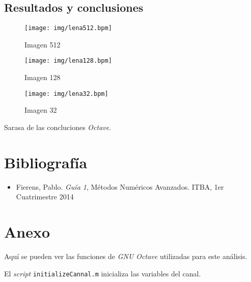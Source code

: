 \documentclass{article}
\begin{document}
\begin{multicols}{2}
\section{Resultados y conclusiones}
\label{sec4}

\begin{figure}[H]
\centering
\texttt{[image: img/lena512.bpm]}
\caption{Imagen 512}
\label{Imagen 512}
\end{figure}

\begin{figure}[H]
\centering
\texttt{[image: img/lena128.bpm]}
\caption{Imagen 128}
\label{Imagen 128}
\end{figure}

\begin{figure}[H]
\centering
\texttt{[image: img/lena32.bpm]}
\caption{Imagen 32}
\label{Imagen 32}
\end{figure}


\par Sarasa de las concluciones \textit{Octave}.\\

\end{multicols}

\section{Bibliografía} 

\begin{itemize}
  \item Fierens, Pablo. \textit{Guía 1}, Métodos Numéricos Avanzados. ITBA, 1er Cuatrimestre 2014

\end{itemize}

\clearpage

\section{Anexo}
\par Aquí se pueden ver las funciones de \textit{GNU Octave} utilizadas para este análisis.\\

\par El \textit{script} \verb+initializeCannal.m+ inicializa las variables del canal.

\begin{ttfamily}
\begin{center}
\end{center}
\end{ttfamily}
\end{document}
